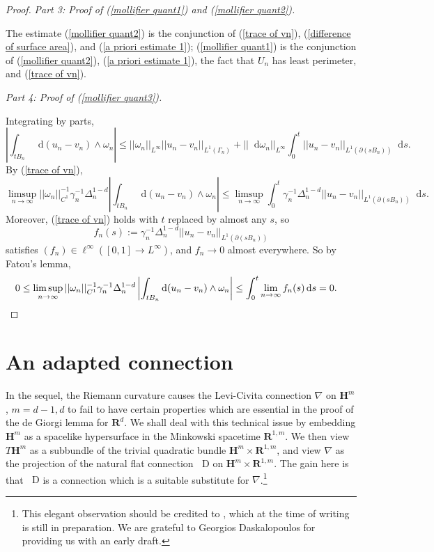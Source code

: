 \documentclass[reqno,12pt,letterpaper]{amsart}
\newcommand{\RR}{\mathbf{R}}
\newcommand{\Hyp}{\mathbf H}
\newcommand*\dif{\mathop{}\!\mathrm{d}}
\newcommand*\Dif{\mathop{}\!\mathrm{D}}
\theoremstyle{definition}
\newcommand{\proofpart}[2]{%
  \par
  \addvspace{\medskipamount}%
  \noindent\emph{Part #1: #2.}
}
\numberwithin{equation}{section}
\begin{document}
\begin{proof}
\proofpart{3}{Proof of (\ref{mollifier quant1}) and (\ref{mollifier quant2})}
The estimate (\ref{mollifier quant2}) is the conjunction of (\ref{trace of vn}), (\ref{difference of surface area}), and (\ref{a priori estimate 1});
(\ref{mollifier quant1}) is the conjunction of (\ref{mollifier quant2}), (\ref{a priori estimate 1}), the fact that $U_n$ has least perimeter, and (\ref{trace of vn}).

\proofpart{4}{Proof of (\ref{mollifier quant3})}
Integrating by parts,
$$\left|\int_{tB_n} \dif (u_n - v_n) \wedge \omega_n\right| \leq ||\omega_n||_{L^\infty} ||u_n - v_n||_{L^1(\Gamma_n)} + ||\dif \omega_n||_{L^\infty} \int_0^t ||u_n - v_n||_{L^1(\partial(sB_n))} \dif s.$$
By (\ref{trace of vn}),
$$\limsup_{n \to \infty} ||\omega_n||_{C^1}^{-1} \gamma_n^{-1} \Delta_n^{1 - d} \left|\int_{tB_n} \dif(u_n - v_n) \wedge \omega_n\right| \leq \limsup_{n \to \infty} \int_0^t \gamma_n^{-1} \Delta_n^{1 - d} ||u_n - v_n||_{L^1(\partial(sB_n))} \dif s.$$
Moreover, (\ref{trace of vn}) holds with $t$ replaced by almost any $s$, so
$$f_n(s) := \gamma_n^{-1} \Delta_n^{1 - d} ||u_n - v_n||_{L^1(\partial(sB_n))}$$
satisfies $(f_n) \in \ell^\infty([0, 1] \to L^\infty)$, and $f_n \to 0$ almost everywhere.
So by Fatou's lemma,
\begin{align*}
0 \leq \limsup_{n \to \infty} ||\omega_n||_{C^1}^{-1} \gamma_n^{-1} \Delta_n^{1 - d} \left|\int_{tB_n} \dif(u_n - v_n) \wedge \omega_n\right| &\leq \int_0^t \lim_{n \to \infty} f_n(s) \dif s = 0. \qedhere
\end{align*}
\end{proof}

\section{An adapted connection}\label{wave section}
In the sequel, the Riemann curvature causes the Levi-Civita connection $\nabla$ on $\Hyp^m$, $m = d - 1, d$ to fail to have certain properties which are essential in the proof of the de Giorgi lemma for $\RR^d$.
We shall deal with this technical issue by embedding $\Hyp^m$ as a spacelike hypersurface in the Minkowski spacetime $\RR^{1, m}$.
We then view $T\Hyp^m$ as a subbundle of the trivial quadratic bundle $\Hyp^m \times \RR^{1, m}$, and view $\nabla$ as the projection of the natural flat connection $\Dif$ on $\Hyp^m \times \RR^{1, m}$.
The gain here is that $\Dif$ is a connection which is a suitable substitute for $\nabla$.\footnote{This elegant observation should be credited to \cite{daskalopoulosPrep1}, which at the time of writing is still in preparation. We are grateful to Georgios Daskalopoulos for providing us with an early draft.}
\end{document}
